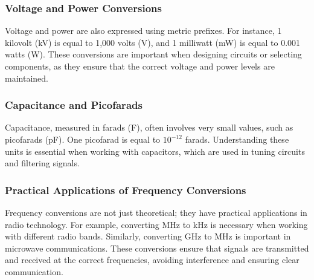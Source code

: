 \subsubsection*{Voltage and Power Conversions}
Voltage and power are also expressed using metric prefixes. For instance, 1 kilovolt (kV) is equal to 1,000 volts (V), and 1 milliwatt (mW) is equal to 0.001 watts (W). These conversions are important when designing circuits or selecting components, as they ensure that the correct voltage and power levels are maintained.

\subsubsection*{Capacitance and Picofarads}
Capacitance, measured in farads (F), often involves very small values, such as picofarads (pF). One picofarad is equal to $10^{-12}$ farads. Understanding these units is essential when working with capacitors, which are used in tuning circuits and filtering signals.

\subsubsection*{Practical Applications of Frequency Conversions}
Frequency conversions are not just theoretical; they have practical applications in radio technology. For example, converting MHz to kHz is necessary when working with different radio bands. Similarly, converting GHz to MHz is important in microwave communications. These conversions ensure that signals are transmitted and received at the correct frequencies, avoiding interference and ensuring clear communication.



